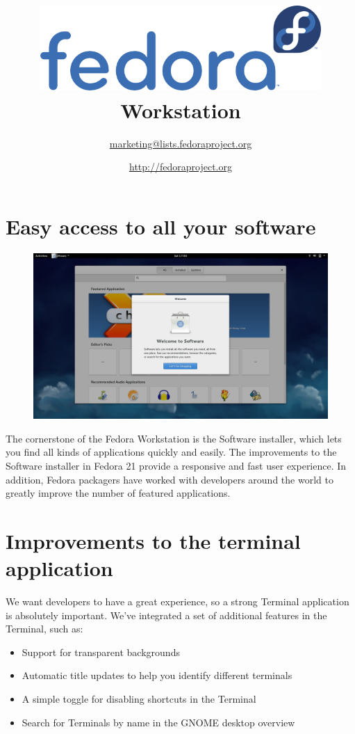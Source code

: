 \documentclass[
a4paper,
10pt
]{leaflet}
\title{\includegraphics[keepaspectratio,width=0.8\textwidth]{Logo_fedoralogo.png}\vspace{1cm}\\Workstation}
\date{\Large{\textcolor{FedoraBlue}{\href{http://fedoraproject.org}{http://fedoraproject.org}}}}
\author{\href{mailto:marketing@lists.fedoraproject.org}{marketing@lists.fedoraproject.org}}
\begin{document}
\maketitle
\thispagestyle{fancy}
\renewcommand{\headrulewidth}{0pt}

\fancyfoot{}
\fancyhead{}


\newpage


\section{\textcolor{FedoraBlue}{Easy access to all your software}}
\begin{figure}[h]
  \includegraphics[keepaspectratio,width=\textwidth]{Gnome_software_welcome.png}
\end{figure}
The cornerstone of the Fedora Workstation is the Software installer, which lets you find all kinds of applications quickly and easily. The improvements to the Software installer in Fedora 21 provide a responsive and fast user experience. In addition, Fedora packagers have worked with developers around the world to greatly improve the number of featured applications.

\section{\textcolor{FedoraBlue}{Improvements to the terminal application}}

We want developers to have a great experience, so a strong Terminal application is absolutely important. We've integrated a set of additional features in the Terminal, such as:
\begin{itemize}
  \item Support for transparent backgrounds
  \item Automatic title updates to help you identify different terminals
  \item A simple toggle for disabling shortcuts in the Terminal
  \item Search for Terminals by name in the GNOME desktop overview
\end{itemize}
\end{document}
